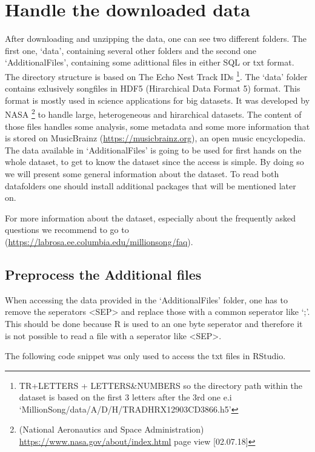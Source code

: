 \documentclass[]{article}
\let\rmarkdownfootnote\footnote%
\def\footnote{\protect\rmarkdownfootnote}
\begin{document}
\section{Handle the downloaded data}\label{handle-the-downloaded-data}

After downloading and unzipping the data, one can see two different
folders. The first one, `data', containing several other folders and the
second one `AdditionalFiles', containing some adittional files in either
SQL or txt format. The directory structure is based on The Echo Nest
Track IDs \footnote{TR+LETTERS + LETTERS\&NUMBERS so the directory path
  within the dataset is based on the first 3 letters after the 3rd one
  e.i `MillionSong/data/A/D/H/TRADHRX12903CD3866.h5'}. The `data' folder
contains exlusively songfiles in HDF5 (Hirarchical Data Format 5)
format. This format is mostly used in science applications for big
datasets. It was developed by NASA \footnote{(National Aeronautics and
  Space Administration) \url{https://www.nasa.gov/about/index.html} page
  view {[}02.07.18{]}} to handle large, heterogeneous and hirarchical
datasets. The content of those files handles some analysis, some
metadata and some more information that is stored on MusicBrainz
(\url{https://musicbrainz.org}), an open music encyclopedia. The data
available in `AdditionalFiles' is going to be used for first hands on
the whole dataset, to get to know the dataset since the access is
simple. By doing so we will present some general information about the
dataset. To read both datafolders one should install additional packages
that will be mentioned later on.

For more information about the dataset, especially about the frequently
asked questions we recommend to go to
(\url{https://labrosa.ee.columbia.edu/millionsong/faq}).

\subsection{Preprocess the Additional
files}\label{preprocess-the-additional-files}

When accessing the data provided in the `AdditionalFiles' folder, one
has to remove the seperators \textless{}SEP\textgreater{} and replace
those with a common seperator like `;'. This should be done because R is
used to an one byte seperator and therefore it is not possible to read a
file with a seperator like \textless{}SEP\textgreater{}.

The following code snippet was only used to access the txt files in
RStudio.
\end{document}
